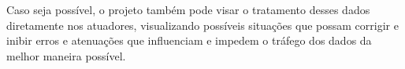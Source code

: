 \documentclass[conference]{IEEEtran}
\begin{document}
Caso seja poss\'ivel, o projeto tamb\'em pode visar o tratamento desses dados diretamente nos atuadores, visualizando poss\'iveis situa\c{c}\~oes que possam corrigir e inibir erros e atenua\c{c}\~oes que influenciam e impedem o tr\'afego dos dados da melhor maneira poss\'ivel.














\def\refname{Referências}


%






\end{document}
